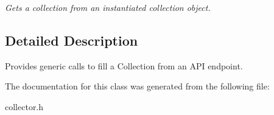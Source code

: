 \begin{DoxyCompactItemize}
\begin{DoxyCompactList}\small\item\em Gets a collection from an instantiated collection object. \end{DoxyCompactList}\end{DoxyCompactItemize}


\subsection{Detailed Description}
Provides generic calls to fill a Collection from an A\+PI endpoint. 

The documentation for this class was generated from the following file\+:\begin{DoxyCompactItemize}
\item 
collector.\+h\end{DoxyCompactItemize}
